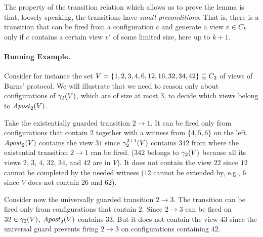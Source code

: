The property of the transition relation which allows us to prove the
lemma is that, loosely speaking, the transitions have \emph{small
  preconditions}. That is, there is a transition that can be fired
from a configuration $c$ and generate a view $v\in\viewsof k$ only if
$c$ contains a certain view $v'$ of some limited size, here up to $k+1$.

\paragraph{Running Example.}
Consider for instance the set $V = \{1,2,3,4,6,12,16,32,34,42\}\subseteq
\viewsof 2$ of views of Burns' protocol.
%
We will illustrate that we need to reason only about configurations of
$\gammaof 2(V)$, which are of size at most $3$, to decide which views
belong to $\apostof V 2$.

Take the existentially guarded transition $2\rightarrow 1$.
It can be fired only from configurations that contain $2$ together
with a witness from $\{4,5,6\}$ on the left.
%
$\apost 2(V)$ contains the view $31$ since $\limgammaof 2 {2+1}(V)$
contains $342$ from where the existential transition $2\rightarrow 1$
can be fired.  ($342$ belongs to $\gammaof 2(V)$ because all its views
$2$, $3$, $4$, $32$, $34$, and $42$ are in $V$).
%
It does not contain the view $22$ since $12$ cannot be completed by
the needed witness ($12$ cannot be extended by, e.g., $6$ since $V$
does not contain $26$ and $62$).

Consider now the universally guarded
transition $2\rightarrow 3$. The transition can be fired only from
configurations that contain $2$.
%
Since $2\rightarrow 3$ can be fired on $32\in\gammaof 2(V)$, $\apost 2(V)$
contains $33$.  But it does not contain the view $43$ since the
universal guard prevents firing $2\rightarrow 3$ on configurations
containing $42$.



